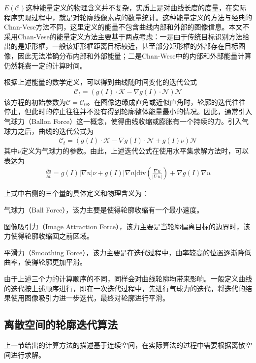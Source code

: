 $E(\mathcal{C})$这种能量定义的物理含义并不复杂，实质上是对曲线长度的度量，在实际程序实现过程中，就是对轮廓线像素点的数量统计。这种能量定义的方法与经典的Chan-Vese方法\cite{Chan2001}不同，这里定义的能量不包含曲线内部和外部的图像信息。本文不采用Chan-Vese的能量定义方法主要基于两点考虑：一是由于传统目标识别方法给出的是矩形框，一般该矩形框距离目标较近，甚至部分矩形框的外部存在目标图像，因此无法准确分布内部和外部能量；二是Chan-Wese中的内部和外部能量计算仍然耗费一定的计算时间。

根据上述能量的数学定义，可以得到曲线随时间变化的迭代公式
\begin{align}
\mathcal{C}_t=(g(I)\cdot \mathcal{K}-\nabla g(I)\cdot\mathcal{N})\mathcal{N}
\end{align}
该方程的初始参数为$\mathcal{C}=\mathcal{C}_0$。在图像边缘成直角或近似直角时，轮廓的迭代往往停止，但此时的停止往往并不没有得到轮廓整体能量最小的情况。因此，通常引入气球力（Ballon Force）这一概念，使得曲线收缩或膨胀有一个持续的力。引入气球力之后，曲线的迭代公式为
\begin{align}
\mathcal{C}_t=(g(I)\cdot \mathcal{K}-\nabla g(I)\cdot\mathcal{N}+g(I) \nu)\mathcal{N}
\end{align}
其中$\nu$定义为气球力的参数。由此，上述迭代公式在使用水平集求解方法时，可以表达为
\begin{align}
\frac{\partial u}{\partial t} = g(I)|\nabla u|\nu +g(I) |\nabla u|\text{div}(\frac{\nabla u}{|\nabla u|}) + \nabla g(I) \nabla u
\end{align}

上式中右侧的三个量的具体定义和物理含义为：
\begin{compactenum}
\item 气球力（Ball Force），该力主要是使得轮廓收缩有一个最小速度。\item 图像吸引力（Image Attraction Force），该力主要是当轮廓偏离目标的边界时，该力使得轮廓收缩回之前区域。\item 平滑力（Smoothing Force），该力主要是在迭代过程中，曲率较高的位置逐渐降低曲率，使得轮廓更加平滑。
\end{compactenum}

由于上述三个力的计算顺序的不同，同样会对曲线轮廓均带来影响。一般定义曲线的迭代按上述顺序进行，即在一次迭代过程中，先进行气球力的迭代，将迭代的结果使用图像吸引力进一步迭代，最终对轮廓进行平滑。

\subsection{离散空间的轮廓迭代算法}
上一节给出的计算方法的描述基于连续空间，在实际算法的过程中需要根据离散空间进行求解。

